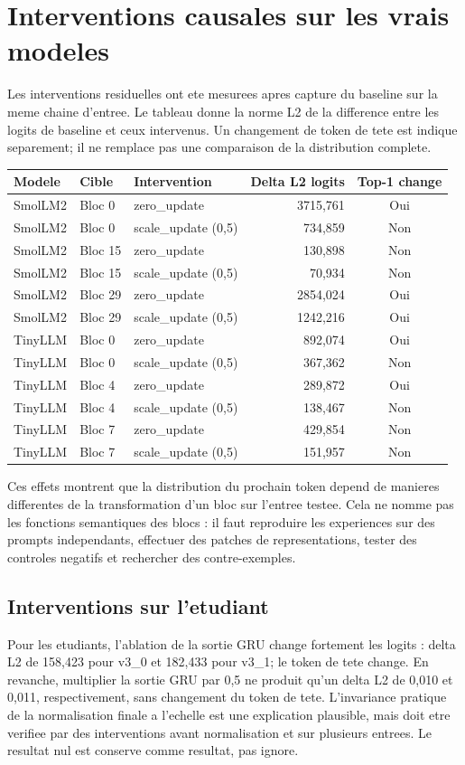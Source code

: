 \documentclass[11pt,a4paper]{article}
\begin{document}
\section{Interventions causales sur les vrais modeles}
Les interventions residuelles ont ete mesurees apres capture du baseline sur la meme chaine d'entree. Le tableau donne la norme L2 de la difference entre les logits de baseline et ceux intervenus. Un changement de token de tete est indique separement; il ne remplace pas une comparaison de la distribution complete.
\begin{longtable}{p{2.4cm}p{2.0cm}p{2.2cm}r c}
\toprule
\textbf{Modele} & \textbf{Cible} & \textbf{Intervention} & \textbf{Delta L2 logits} & \textbf{Top-1 change}\\
\midrule
\endhead
SmolLM2 & Bloc 0 & zero\_update & 3715,761 & Oui\\
SmolLM2 & Bloc 0 & scale\_update (0,5) & 734,859 & Non\\
SmolLM2 & Bloc 15 & zero\_update & 130,898 & Non\\
SmolLM2 & Bloc 15 & scale\_update (0,5) & 70,934 & Non\\
SmolLM2 & Bloc 29 & zero\_update & 2854,024 & Oui\\
SmolLM2 & Bloc 29 & scale\_update (0,5) & 1242,216 & Oui\\
\midrule
TinyLLM & Bloc 0 & zero\_update & 892,074 & Oui\\
TinyLLM & Bloc 0 & scale\_update (0,5) & 367,362 & Non\\
TinyLLM & Bloc 4 & zero\_update & 289,872 & Oui\\
TinyLLM & Bloc 4 & scale\_update (0,5) & 138,467 & Non\\
TinyLLM & Bloc 7 & zero\_update & 429,854 & Non\\
TinyLLM & Bloc 7 & scale\_update (0,5) & 151,957 & Non\\
\bottomrule
\end{longtable}

Ces effets montrent que la distribution du prochain token depend de manieres differentes de la transformation d'un bloc sur l'entree testee. Cela ne nomme pas les fonctions semantiques des blocs : il faut reproduire les experiences sur des prompts independants, effectuer des patches de representations, tester des controles negatifs et rechercher des contre-exemples.

\subsection{Interventions sur l'etudiant}
Pour les etudiants, l'ablation de la sortie GRU change fortement les logits : delta L2 de 158,423 pour v3\_0 et 182,433 pour v3\_1; le token de tete change. En revanche, multiplier la sortie GRU par 0,5 ne produit qu'un delta L2 de 0,010 et 0,011, respectivement, sans changement du token de tete. L'invariance pratique de la normalisation finale a l'echelle est une explication plausible, mais doit etre verifiee par des interventions avant normalisation et sur plusieurs entrees. Le resultat nul est conserve comme resultat, pas ignore.
\end{document}
